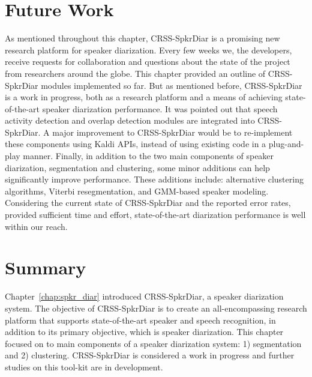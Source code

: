 \section{Future Work}
\label{sec:chDiar_future}
As mentioned throughout this chapter, CRSS-SpkrDiar is a promising new research platform for speaker diarization. 
Every few weeks we, the developers, receive requests for collaboration and questions about the state of the project from researchers around the globe. 
This chapter provided an outline of CRSS-SpkrDiar modules implemented so far. 
But as mentioned before, CRSS-SpkrDiar is a work in progress, both as a research platform and a means of achieving state-of-the-art speaker diarization performance. 
It was pointed out that speech activity detection and overlap detection modules are integrated into CRSS-SpkrDiar. 
A major improvement to CRSS-SpkrDiar would be to re-implement these components using Kaldi APIs, instead of using existing code in a plug-and-play manner. 
Finally, in addition to the two main components of speaker diarization, segmentation and clustering, some minor additions can help significantly improve performance. 
These additions include: alternative clustering algorithms, Viterbi resegmentation, and GMM-based speaker modeling. 
Considering the current state of CRSS-SpkrDiar and the reported error rates, provided sufficient time and effort, state-of-the-art diarization performance is well within our reach.


\section{Summary}
\label{sec:ch4_summary}
Chapter~\ref{chap:spkr_diar} introduced CRSS-SpkrDiar, a  speaker diarization system. 
The objective of CRSS-SpkrDiar is to create an all-encompassing research platform that supports state-of-the-art speaker and speech recognition, in addition to its primary objective, which is speaker diarization. 
This chapter focused on to main components of a speaker diarization system: 1) segmentation and 2) clustering. 
CRSS-SpkrDiar is considered a work in progress and further studies on this tool-kit are in development. 

